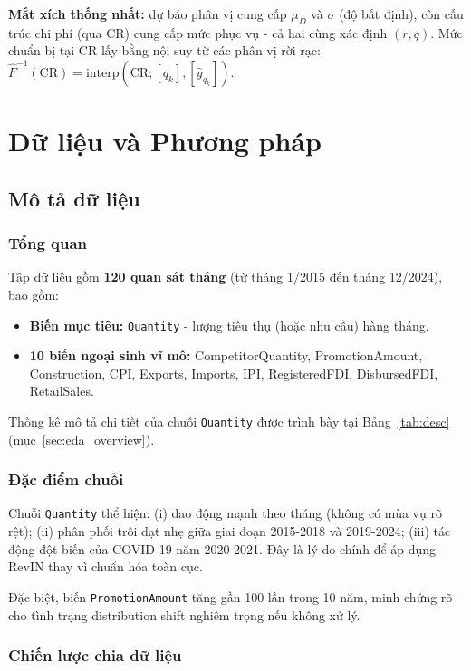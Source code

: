 \documentclass[12pt, a4paper]{report}
\newcommand{\CR}{\ensuremath{\mathrm{CR}}}
\begin{document}
\textbf{Mắt xích thống nhất:} dự báo phân vị cung cấp $\mu_D$ và $\sigma$ (độ bất định), còn cấu trúc chi phí (qua $\CR$) cung cấp mức phục vụ - cả hai cùng xác định $(r,q)$. Mức chuẩn bị tại $\CR$ lấy bằng nội suy từ các phân vị rời rạc: $\hat F^{-1}(\CR)=\text{interp}(\CR; [q_k],[\hat y_{q_k}])$.

\chapter{Dữ liệu và Phương pháp}

\section{Mô tả dữ liệu}

\subsection{Tổng quan}

Tập dữ liệu gồm \textbf{120 quan sát tháng} (từ tháng 1/2015 đến tháng 12/2024), bao gồm:
\begin{itemize}
  \item \textbf{Biến mục tiêu:} \texttt{Quantity} - lượng tiêu thụ (hoặc nhu cầu) hàng tháng.
  \item \textbf{10 biến ngoại sinh vĩ mô:} CompetitorQuantity, PromotionAmount, Construction, CPI, Exports, Imports, IPI, RegisteredFDI, DisbursedFDI, RetailSales.
\end{itemize}

Thống kê mô tả chi tiết của chuỗi \texttt{Quantity} được trình bày tại Bảng~\ref{tab:desc} (mục~\ref{sec:eda_overview}).

\subsection{Đặc điểm chuỗi}

Chuỗi \texttt{Quantity} thể hiện: (i) dao động mạnh theo tháng (không có mùa vụ rõ rệt); (ii) phân phối trôi dạt nhẹ giữa giai đoạn 2015-2018 và 2019-2024; (iii) tác động đột biến của COVID-19 năm 2020-2021. Đây là lý do chính để áp dụng RevIN thay vì chuẩn hóa toàn cục.

Đặc biệt, biến \texttt{PromotionAmount} tăng gần 100 lần trong 10 năm, minh chứng rõ cho tình trạng distribution shift nghiêm trọng nếu không xử lý.

\subsection{Chiến lược chia dữ liệu}
\end{document}
